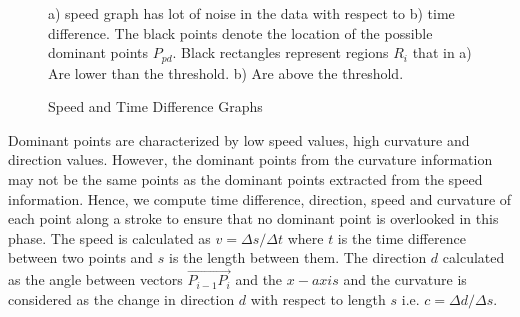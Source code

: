 \documentclass[preprint,10pt,5p,twocolumn]{elsarticle}
\begin{document}
\begin{figure}
	\caption{Speed and Time Difference Graphs}  a) speed graph has lot of noise in the data with respect to b) time difference.   The black points denote the location of the possible dominant points $P_{pd}$. Black rectangles represent regions $R_i$ that in a) Are lower than the threshold. b) Are above the threshold. 
	\label{fig:speed2Distance}
\end{figure}
 
Dominant points are characterized by low speed values, high curvature and direction values. However, the dominant points from the curvature information may not be the same points as the dominant points extracted from the speed information. Hence, we compute time difference, direction, speed and curvature of each point along a stroke to ensure that no dominant point is overlooked in this phase. The speed is calculated as $v=\Delta s/\Delta t$ where $t$ is the time difference between two points and $s$ is the length between them. The direction $d$ calculated as the angle between vectors $\overrightarrow {P_{i - 1} P_i }$ and the $x-axis$ and the curvature is considered as the change in direction $d$ with respect to length $s$ i.e. $c= \Delta d/\Delta s$. 
  
\end{document}
